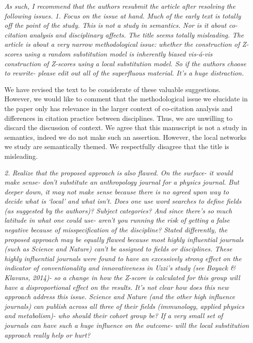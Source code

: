 \documentclass[11pt, oneside]{article}   	%
\begin{document}
\emph{As such, I recommend that the authors resubmit the article after resolving the following issues. 1.  Focus on the issue at hand.  Much of the early text is totally off the point of the study. This is not a study in semantics. Nor is it about co-citation analysis and disciplinary affects. The title seems totally misleading. The article is about a very narrow methodological issue: whether the construction of Z-scores using a random substitution model is inherently biased vis-\'a-vis construction of Z-scores using a local substitution model.  So if the authors choose to rewrite- please edit out all of the superfluous material. It's a huge distraction.} 

We have revised the text to be considerate of these valuable suggestions. However, we would like to comment that the methodological issue we elucidate in the paper only has relevance in the larger context of co-citation analysis and differences in citation practice between disciplines. Thus, we are unwilling to discard the discussion of context. We agree that this manuscript is not a study in semantics, indeed we do not make such an assertion. However, the local networks we study are semantically themed. We respectfully disagree that the title is misleading. 

\emph{2.  Realize that the proposed approach is also flawed.  On the surface- it would make sense- don't substitute an anthropology journal for a physics journal. But deeper down, it may not make sense because there is no agreed upon way to decide what is `local' and what isn't.  Does one use word searches to define fields (as suggested by the authors)?  Subject categories?  And since there's so much latitude in what one could use- aren't you running the risk of getting a false negative because of misspecification of the discipline?  Stated differently, the proposed approach may be equally flawed because most highly influential journals (such as Science and Nature) can't be assigned to fields or disciplines.   These highly influential journals were found to have an excessively strong effect on the indicator of conventionality and innovativeness in Uzzi's study (see Boyack \& Klavans, 2014)- so a change in how the Z-score is calculated for this group will have a disproportional effect on the results. It's not clear how does this new approach address this issue.  Science and Nature (and the other high influence journals) can publish across all three of their fields (immunology, applied physics and metabolism)- who should their cohort group be?  If a very small set of journals can have such a huge influence on the outcome- will the local substitution approach really help or hurt?}
\end{document}
